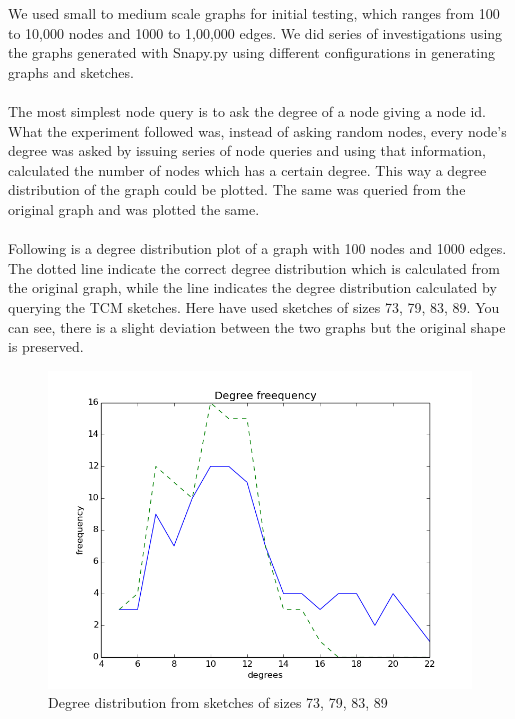 \documentclass[12pt]{report}
\numberwithin{figure}{section}
\numberwithin{table}{section}
\begin{document}
We used small to medium scale graphs for initial testing, which ranges from 100 to 10,000 nodes and 1000 to 1,00,000 edges.  We did series of investigations using the graphs generated with Snapy.py using different configurations in generating graphs and sketches.

\paragraph{}

The most simplest node query is to ask the degree of a node giving a node id. What the experiment followed was, instead of asking random nodes, every node’s degree was asked by issuing series of node queries and using that information, calculated the number of nodes which has a certain degree. This way a degree distribution of the graph could be plotted. The same was queried from the original graph and was plotted the same.

\paragraph{}

Following is a degree distribution plot of a graph with 100 nodes and 1000 edges. The dotted line indicate the correct degree distribution which is calculated from the original graph, while the line indicates the degree distribution calculated by querying the TCM sketches. Here have used sketches of sizes 73, 79, 83, 89. You can see, there is a slight deviation between the two graphs but the original shape is preserved. 

\begin{figure}[H]
\centering
\includegraphics[scale=0.6]{images/dd1}
\caption{Degree distribution from sketches of sizes 73, 79, 83, 89}
\end{figure}
\end{document}
